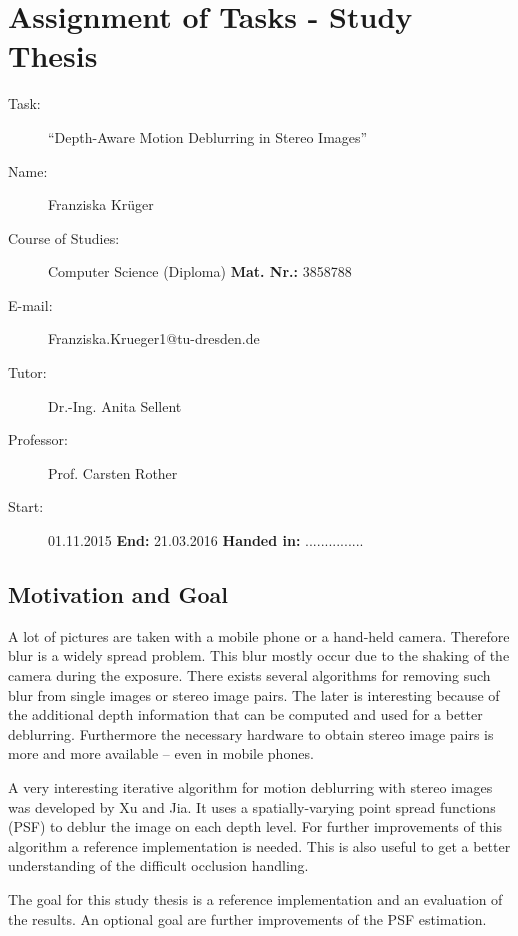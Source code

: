 \documentclass[a4paper, 12pt]{scrartcl}
\begin{document}
\section*{Assignment of Tasks - Study Thesis}
\begin{description}
\item[Task:] \enquote{Depth-Aware Motion Deblurring in Stereo Images}
\\
\item[Name:] Franziska Krüger
\item[Course of Studies:] Computer Science (Diploma)  \hfill{\textbf{Mat. Nr.:} 3858788}
\item[E-mail:] Franziska.Krueger1@tu-dresden.de
\\
\item[Tutor:] Dr.-Ing. Anita Sellent
\item[Professor:] Prof. Carsten Rother
\item[Start:] 01.11.2015  \hfill{\textbf{End:} 21.03.2016} \hfill{\textbf{Handed in:} ...............}
\end{description}



\subsection*{Motivation and Goal}
A lot of pictures are taken with a mobile phone or a hand-held camera. Therefore blur is a widely spread problem. This blur mostly occur due to the shaking of the camera during the exposure. There exists several algorithms for removing such blur from single images or stereo image pairs. The later is interesting because of the additional depth information that can be computed and used for a better deblurring. Furthermore the necessary hardware to obtain stereo image pairs is more and more available – even in mobile phones.

A very interesting iterative algorithm for motion deblurring with stereo images was developed by Xu and Jia. It uses a spatially-varying point spread functions (PSF) to deblur the image on each depth level. For further improvements of this algorithm a reference implementation is needed. This is also useful to get a better understanding of the difficult occlusion handling.

The goal for this study thesis is a reference implementation and an evaluation of the results. An optional goal are further improvements of the PSF estimation.
\end{document}
